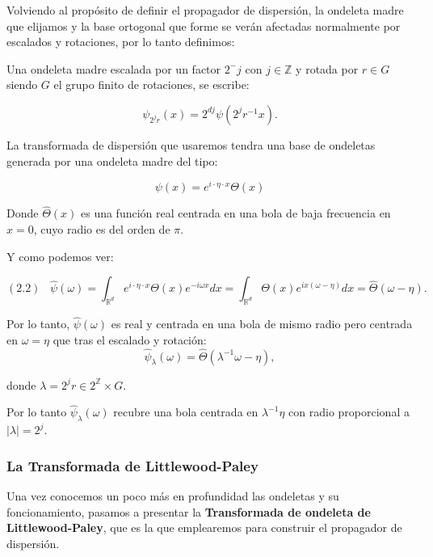\medskip 

\noindent Volviendo al propósito de definir el propagador de dispersión, la ondeleta madre que elijamos y la base ortogonal que forme se verán afectadas normalmente por escalados y rotaciones, por lo tanto definimos: 

\begin{definicion}
  Una ondeleta madre escalada por un factor $2^-j$ con $j \in \mathbb{Z}$ y rotada por $r \in G$ siendo $G$ el grupo finito de rotaciones, se escribe: 

  $$\psi_{2^j r}(x)=2^{dj} \psi(2^j r^{-1} x).$$
\end{definicion}


\medskip

\noindent La transformada de dispersión que usaremos tendra una base de ondeletas generada por una ondeleta madre del tipo:

$$\psi(x)=e^{i\cdot \eta \cdot  x} \Theta(x)$$

\noindent Donde $\widehat{\Theta}(x)$ es una función real centrada en una bola de baja frecuencia en $x=0$, cuyo radio es del orden de $\pi$.

\medskip

\noindent Y como podemos ver:

$$(2.2) \;\;\; \widehat{\psi}(\omega)=\int_{\mathbb{R}^d}e^{i\cdot \eta \cdot  x} \Theta(x) e^{-i\omega x} dx=\int_{\mathbb{R}^d}\Theta(x) e^{ix(\omega-\eta)} dx=\widehat{\Theta}(\omega-\eta).$$

\medskip

\noindent Por lo tanto, $\widehat{\psi}(\omega)$ es real y centrada en una bola de mismo radio pero centrada en $\omega=\eta$ que tras el escalado y rotación: 
$$\widehat{\psi}_\lambda(\omega)= \widehat{\Theta} (\lambda^{-1}\omega-\eta),$$ 

\noindent donde $\lambda=2^jr \in 2^{\mathbb{Z}}\times G$. 

\noindent Por lo tanto $\widehat{\psi}_\lambda(\omega)$ recubre una bola centrada en $\lambda^{-1}\eta$ con radio proporcional a $|\lambda|=2^j$.
 
\medskip 

\subsubsection{La Transformada de Littlewood-Paley}

\noindent Una vez conocemos un poco más en profundidad las ondeletas y su foncionamiento, pasamos a presentar la \textbf{Transformada de ondeleta de Littlewood-Paley}, que es la que emplearemos para construir el propagador de dispersión.


